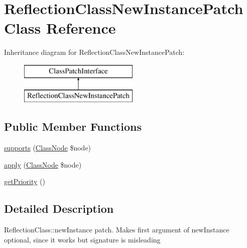 \hypertarget{class_prophecy_1_1_doubler_1_1_class_patch_1_1_reflection_class_new_instance_patch}{}\section{Reflection\+Class\+New\+Instance\+Patch Class Reference}
\label{class_prophecy_1_1_doubler_1_1_class_patch_1_1_reflection_class_new_instance_patch}
Inheritance diagram for Reflection\+Class\+New\+Instance\+Patch\+:\begin{figure}[H]
\begin{center}
\leavevmode
\includegraphics[height=2.000000cm]{class_prophecy_1_1_doubler_1_1_class_patch_1_1_reflection_class_new_instance_patch}
\end{center}
\end{figure}
\subsection*{Public Member Functions}
\begin{DoxyCompactItemize}
\item 
\mbox{\hyperlink{class_prophecy_1_1_doubler_1_1_class_patch_1_1_reflection_class_new_instance_patch_a99b2455ac194faf79aff042c55719ac2}{supports}} (\mbox{\hyperlink{class_prophecy_1_1_doubler_1_1_generator_1_1_node_1_1_class_node}{Class\+Node}} \$node)
\item 
\mbox{\hyperlink{class_prophecy_1_1_doubler_1_1_class_patch_1_1_reflection_class_new_instance_patch_a62fdb697928f35fc782d6889b8fe9b8b}{apply}} (\mbox{\hyperlink{class_prophecy_1_1_doubler_1_1_generator_1_1_node_1_1_class_node}{Class\+Node}} \$node)
\item 
\mbox{\hyperlink{class_prophecy_1_1_doubler_1_1_class_patch_1_1_reflection_class_new_instance_patch_a1e7a3c168dcd0901a0d2669c67575b55}{get\+Priority}} ()
\end{DoxyCompactItemize}


\subsection{Detailed Description}
Reflection\+Class\+::new\+Instance patch. Makes first argument of new\+Instance optional, since it works but signature is misleading

